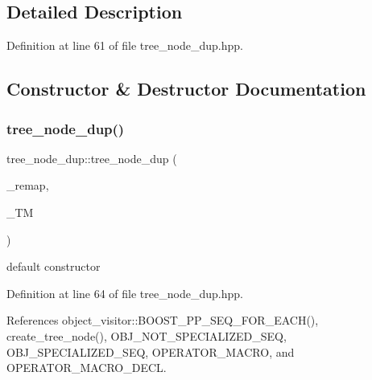 \subsection{Detailed Description}


Definition at line 61 of file tree\+\_\+node\+\_\+dup.\+hpp.



\subsection{Constructor \& Destructor Documentation}
\mbox{\label{structtree__node__dup_afe9798b8ebac6b2c69c2abd5423bcf5c}} 
\subsubsection{\texorpdfstring{tree\+\_\+node\+\_\+dup()}{tree\_node\_dup()}}
{\footnotesize\ttfamily tree\+\_\+node\+\_\+dup\+::tree\+\_\+node\+\_\+dup (\begin{DoxyParamCaption}\item[{\hyperlink{custom__map_8hpp_a7314a7df1cdb3a3acf478ab86e95c226}{Custom\+Unordered\+Map\+Stable}$<$ unsigned int, unsigned int $>$ \&}]{\+\_\+remap,  }\item[{const \hyperlink{tree__manager_8hpp_a96ff150c071ce11a9a7a1e40590f205e}{tree\+\_\+manager\+Ref}}]{\+\_\+\+TM }\end{DoxyParamCaption})\hspace{0.3cm}{\ttfamily [inline]}}



default constructor 



Definition at line 64 of file tree\+\_\+node\+\_\+dup.\+hpp.



References object\+\_\+visitor\+::\+B\+O\+O\+S\+T\+\_\+\+P\+P\+\_\+\+S\+E\+Q\+\_\+\+F\+O\+R\+\_\+\+E\+A\+C\+H(), create\+\_\+tree\+\_\+node(), O\+B\+J\+\_\+\+N\+O\+T\+\_\+\+S\+P\+E\+C\+I\+A\+L\+I\+Z\+E\+D\+\_\+\+S\+EQ, O\+B\+J\+\_\+\+S\+P\+E\+C\+I\+A\+L\+I\+Z\+E\+D\+\_\+\+S\+EQ, O\+P\+E\+R\+A\+T\+O\+R\+\_\+\+M\+A\+C\+RO, and O\+P\+E\+R\+A\+T\+O\+R\+\_\+\+M\+A\+C\+R\+O\+\_\+\+D\+E\+CL.

